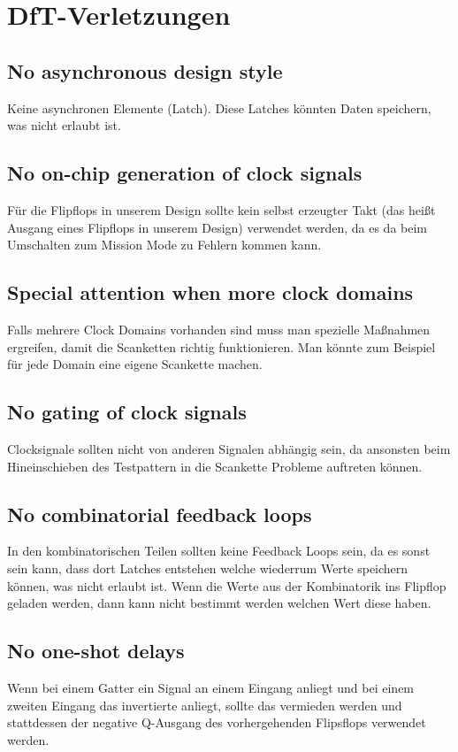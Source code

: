 \documentclass[12pt,a4paper]{article}
\begin{document}
\section{DfT-Verletzungen}

\subsection{No asynchronous design style}
Keine asynchronen Elemente (Latch). Diese Latches könnten Daten speichern, was nicht erlaubt ist.
\subsection{No on-chip generation of clock signals}
Für die Flipflops in unserem Design sollte kein selbst erzeugter Takt (das heißt Ausgang eines Flipflops in unserem Design) verwendet werden, da es da beim Umschalten zum Mission Mode zu Fehlern kommen kann.
\subsection{Special attention when more clock domains}
Falls mehrere Clock Domains vorhanden sind muss man spezielle Maßnahmen ergreifen, damit die Scanketten richtig funktionieren. Man könnte zum Beispiel für jede Domain eine eigene Scankette machen.
\subsection{No gating of clock signals}
Clocksignale sollten nicht von anderen Signalen abhängig sein, da ansonsten beim Hineinschieben des Testpattern in die Scankette Probleme auftreten können.
\subsection{No combinatorial feedback loops}
In den kombinatorischen Teilen sollten keine Feedback Loops sein, da es sonst sein kann, dass dort Latches entstehen welche wiederrum Werte speichern können, was nicht erlaubt ist. Wenn die Werte aus der Kombinatorik ins Flipflop geladen werden, dann kann nicht bestimmt werden welchen Wert diese haben.
\subsection{No one-shot delays}
Wenn bei einem Gatter ein Signal an einem Eingang anliegt und bei einem zweiten Eingang das invertierte anliegt, sollte das vermieden werden und stattdessen der negative Q-Ausgang des vorhergehenden Flipsflops verwendet werden.
\end{document}
